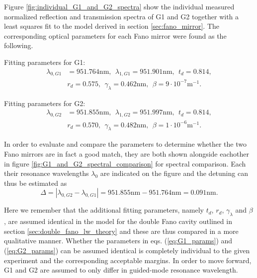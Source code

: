 Figure \ref{fig:individual_G1_and_G2_spectra} show the individual measured normalized reflection and transmission spectra of G1 and G2 together with a least squares fit to the model derived in section \ref{sec:fano_mirror}. The corresponding optical parameters for each Fano mirror were found as the following.

Fitting parameters for G1:
\begin{equation}
    \begin{split}
        \lambda_{0,G1} &= 951.764 \text{nm}, \:\: \lambda_{1,G1} = 951.901 \text{nm},\:\: t_d = 0.814, \\&r_d = 0.575, \:\:  \gamma_{\lambda} = 0.462 \text{nm},\:\: \beta = 9 \cdot 10^{-7} \text{m}^{-1}.
    \end{split}
    \label{eq:G1_params}
\end{equation}

Fitting parameters for G2:
\begin{equation}
    \begin{split}
        \lambda_{0,G2} &= 951.855 \text{nm}, \:\: \lambda_{1,G2} = 951.997 \text{nm},\:\: t_d = 0.814, \\&r_d = 0.570, \:\:  \gamma_{\lambda} = 0.482 \text{nm},\:\: \beta = 1 \cdot 10^{-6} \text{m}^{-1}.
    \end{split}
    \label{eq:G2_params}
\end{equation}

In order to evaluate and compare the parameters to determine whether the two Fano mirrors are in fact a good match, they are both shown alongside eachother in figure \ref{fig:G1_and_G2_spectral_comparison} for spectral comparison. Each their resonance wavelengths $\lambda_0$ are indicated on the figure and the detuning can thus be estimated as 
\begin{equation}
    \Delta = \left|\lambda_{0,G2} - \lambda_{0,G1}\right| = 951.855 \text{nm} - 951.764 \text{nm} = 0.091 \text{nm}.
    \label{eq:G1/G2_detuning}
\end{equation}

Here we remember that the additional fitting parameters, namely $t_d$, $r_d$, $\gamma_{\lambda}$ and $\beta$, are assumed identical in the model for the double Fano cavity outlined in section \ref{sec:double_fano_lw_theory} and these are thus compared in a more qualitative manner. Whether the parameters in eqs. (\ref{eq:G1_params}) and (\ref{eq:G2_params}) can be assumed identical is completely individual to the given experiment and the corresponding acceptable margins. In order to move forward, G1 and G2 are assumed to only differ in guided-mode resonance wavelength.

